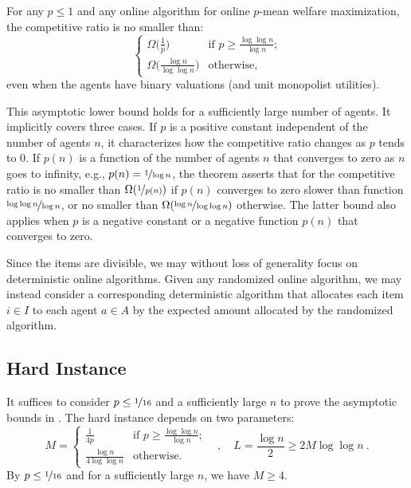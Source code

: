\documentclass[11pt,letterpaper]{article}
\begin{document}
\begin{theorem}
    \label{thm:hardness-positive}
    For any $p \le 1$ and any online algorithm for online $p$-mean welfare maximization, the competitive ratio is no smaller than:
    \[
    	\begin{cases}
    	    \Omega \big( \frac{1}{p} \big) & \mbox{if $p \ge \frac{\log\log n}{\log n}$;} \\[1ex]
            \Omega \big( \frac{\log n}{\log\log n} \big) & \mbox{otherwise,}
    	\end{cases}
    \]
    even when the agents have binary valuations (and unit monopolist utilities).
\end{theorem}

This asymptotic lower bound holds for a sufficiently large number of agents.
It implicitly covers three cases. 
If $p$ is a positive constant independent of the number of agents $n$, it characterizes how the competitive ratio changes as $p$ tends to $0$.
If $p(n)$ is a function of the number of agents $n$ that converges to zero as $n$ goes to infinity, e.g., $p(n) = \nicefrac{1}{\log n}$, the theorem asserts that for the competitive ratio is no smaller than $\Omega(\nicefrac{1}{p(n)})$ if $p(n)$ converges to zero slower than function $\nicefrac{\log\log n}{\log n}$, or no smaller than $\Omega(\nicefrac{\log n}{\log\log n})$ otherwise.
The latter bound also applies when $p$ is a negative constant or a negative function $p(n)$ that converges to zero.










Since the items are divisible, we may without loss of generality focus on deterministic online algorithms.
Given any randomized online algorithm, we may instead consider a corresponding deterministic algorithm that allocates each item $i \in I$ to each agent $a \in A$ by the expected amount allocated by the randomized algorithm.


\subsection{Hard Instance}


It suffices to consider $p \le \nicefrac{1}{16}$ and a sufficiently large $n$ to prove the asymptotic bounds in . 
The hard instance depends on two parameters:
\[
	M =
        \begin{cases}
        \frac{1}{4p} & \mbox{if $p \geq \frac{\log\log n}{\log n}$;}\\[1ex]
        \frac{\log n}{4 \log \log n} & \mbox{otherwise.}
        \end{cases}
	\quad ,\quad
	L = \frac{\log n}{2} \ge 2M \log \log n
	~.
\]
By $p \le \nicefrac{1}{16}$ and for a sufficiently large $n$, we have $M \ge 4$.
\end{document}
